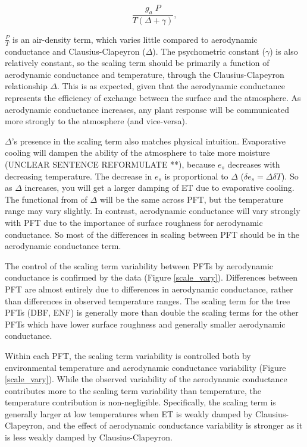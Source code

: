 \documentclass[draft,linenumbers]{gcbjournal}
\begin{document}
\begin{equation}
  \frac{g_a \; P}{T(\Delta + \gamma)},
\end{equation}

$\frac{P}{T}$ is an air-density term, which varies little compared to aerodynamic conductance and Clausius-Clapeyron ($\Delta$). The psychometric constant ($\gamma$) is also relatively constant, so the scaling term should be primarily a function of aerodynamic conductance and temperature, through the Clausius-Clapeyron relationship $\Delta$. This is as expected, given that the aerodynamic conductance represents the efficiency of exchange between the surface and the atmosphere. As aerodynamic conductance  increases, any plant response will be communicated more strongly to the atmosphere (and vice-versa).

$\Delta$'s presence in the scaling term also matches physical intuition. Evaporative cooling will dampen the ability of the atmosphere to take more moisture (UNCLEAR SENTENCE REFORMULATE **), because $e_{s}$ decreases with decreasing temperature. The decrease in $e_{s}$ is proportional to $\Delta$ ($\delta e_{s} = \Delta \delta T$). So as $\Delta$ increases, you will get a larger damping of ET due to evaporative cooling. The functional from of $\Delta$ will be the same across PFT, but the temperature range may vary slightly. In contrast, aerodynamic conductance will vary strongly with PFT due to the importance of surface roughness for aerodynamic conductance. So most of the differences in scaling between PFT should be in the aerodynamic conductance term. 

The control of the scaling term variability between PFTs by aerodynamic conductance is confirmed by the data (Figure \ref{scale_vary}). Differences between PFT are almost entirely due to differences in aerodynamic conductance, rather than differences in observed temperature ranges. The scaling term for the tree PFTs (DBF, ENF) is generally more than double the scaling terms for the other PFTs which have lower surface roughness and generally smaller aerodynamic conductance.

Within each PFT, the scaling term variability is controlled both by environmental temperature and aerodynamic conductance variability (Figure \ref{scale_vary}). While the observed variability of the aerodynamic conductance contributes more to the scaling term variability than temperature, the temperature contribution is non-negligible. Specifically, the scaling term is generally larger at low temperatures when ET is weakly damped by Clausius-Clapeyron, and the effect of aerodynamic conductance variability is stronger as it is less weakly damped by Clausius-Clapeyron.
\end{document}
